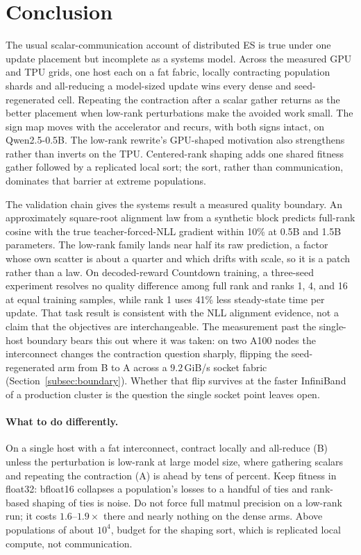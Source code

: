 \section{Conclusion}
The usual scalar-communication account of distributed ES is true under one
update placement but incomplete as a systems model. Across the measured GPU
and TPU grids, one host each on a fat fabric, locally contracting
population shards and all-reducing a
model-sized update wins every dense and seed-regenerated cell. Repeating the
contraction after a scalar gather returns as the better placement when
low-rank perturbations make the avoided work small. The sign map moves with
the accelerator and recurs, with both signs intact, on Qwen2.5-0.5B. The
low-rank rewrite's GPU-shaped motivation also strengthens rather than inverts
on the TPU. Centered-rank shaping adds one shared fitness gather followed by a
replicated local sort; the sort, rather than communication, dominates that
barrier at extreme populations.

The validation chain gives the systems result a measured quality boundary. An
approximately square-root alignment law from a synthetic block predicts
full-rank cosine with the true teacher-forced-NLL gradient within 10\% at 0.5B
and 1.5B parameters. The low-rank family lands near half its raw prediction,
a factor whose own scatter is about a quarter and which drifts with scale,
so it is a patch rather than a law. On decoded-reward Countdown training, a three-seed experiment
resolves no quality difference among full rank and ranks 1, 4, and 16 at equal
training samples, while rank 1 uses 41\% less steady-state time per update.
That task result is consistent with the NLL alignment evidence, not a claim
that the objectives are interchangeable. The measurement past the single-host boundary bears this out where it was
taken: on two A100 nodes the interconnect changes the contraction question
sharply, flipping the seed-regenerated arm from B to A across a $9.2$\,GiB/s
socket fabric (Section~\ref{subsec:boundary}). Whether that flip survives at
the faster InfiniBand of a production cluster is the question the single
socket point leaves open.

\paragraph{What to do differently.} On a single host with a fat
interconnect, contract locally and all-reduce (B) unless the perturbation
is low-rank at large model size, where gathering scalars and repeating the
contraction (A) is ahead by tens of percent. Keep fitness in float32:
bfloat16 collapses a population's losses to a handful of ties and
rank-based shaping of ties is noise. Do not force full matmul precision on
a low-rank run; it costs $1.6$--$1.9\times$ there and nearly nothing on the
dense arms. Above populations of about $10^4$, budget for the shaping
sort, which is replicated local compute, not communication.
